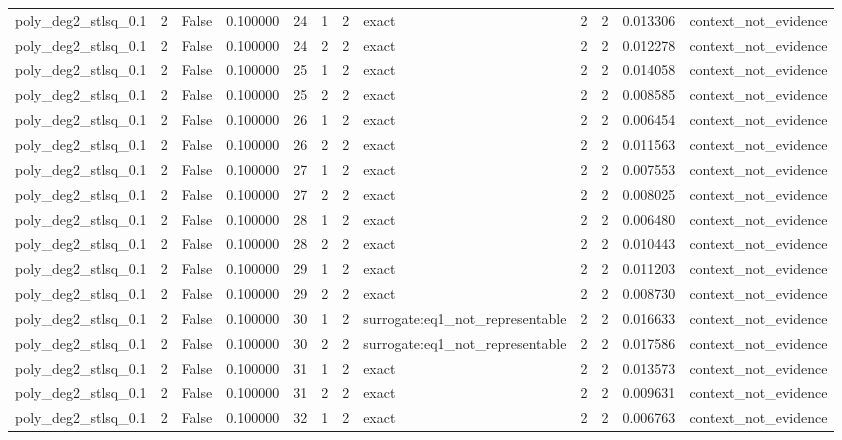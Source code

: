 \begin{tabular}{lrrrrrrlrrrl}
poly\_deg2\_stlsq\_0.1 & 2 & False & 0.100000 & 24 & 1 & 2 & exact & 2 & 2 & 0.013306 & context\_not\_evidence \\
poly\_deg2\_stlsq\_0.1 & 2 & False & 0.100000 & 24 & 2 & 2 & exact & 2 & 2 & 0.012278 & context\_not\_evidence \\
poly\_deg2\_stlsq\_0.1 & 2 & False & 0.100000 & 25 & 1 & 2 & exact & 2 & 2 & 0.014058 & context\_not\_evidence \\
poly\_deg2\_stlsq\_0.1 & 2 & False & 0.100000 & 25 & 2 & 2 & exact & 2 & 2 & 0.008585 & context\_not\_evidence \\
poly\_deg2\_stlsq\_0.1 & 2 & False & 0.100000 & 26 & 1 & 2 & exact & 2 & 2 & 0.006454 & context\_not\_evidence \\
poly\_deg2\_stlsq\_0.1 & 2 & False & 0.100000 & 26 & 2 & 2 & exact & 2 & 2 & 0.011563 & context\_not\_evidence \\
poly\_deg2\_stlsq\_0.1 & 2 & False & 0.100000 & 27 & 1 & 2 & exact & 2 & 2 & 0.007553 & context\_not\_evidence \\
poly\_deg2\_stlsq\_0.1 & 2 & False & 0.100000 & 27 & 2 & 2 & exact & 2 & 2 & 0.008025 & context\_not\_evidence \\
poly\_deg2\_stlsq\_0.1 & 2 & False & 0.100000 & 28 & 1 & 2 & exact & 2 & 2 & 0.006480 & context\_not\_evidence \\
poly\_deg2\_stlsq\_0.1 & 2 & False & 0.100000 & 28 & 2 & 2 & exact & 2 & 2 & 0.010443 & context\_not\_evidence \\
poly\_deg2\_stlsq\_0.1 & 2 & False & 0.100000 & 29 & 1 & 2 & exact & 2 & 2 & 0.011203 & context\_not\_evidence \\
poly\_deg2\_stlsq\_0.1 & 2 & False & 0.100000 & 29 & 2 & 2 & exact & 2 & 2 & 0.008730 & context\_not\_evidence \\
poly\_deg2\_stlsq\_0.1 & 2 & False & 0.100000 & 30 & 1 & 2 & surrogate:eq1\_not\_representable & 2 & 2 & 0.016633 & context\_not\_evidence \\
poly\_deg2\_stlsq\_0.1 & 2 & False & 0.100000 & 30 & 2 & 2 & surrogate:eq1\_not\_representable & 2 & 2 & 0.017586 & context\_not\_evidence \\
poly\_deg2\_stlsq\_0.1 & 2 & False & 0.100000 & 31 & 1 & 2 & exact & 2 & 2 & 0.013573 & context\_not\_evidence \\
poly\_deg2\_stlsq\_0.1 & 2 & False & 0.100000 & 31 & 2 & 2 & exact & 2 & 2 & 0.009631 & context\_not\_evidence \\
poly\_deg2\_stlsq\_0.1 & 2 & False & 0.100000 & 32 & 1 & 2 & exact & 2 & 2 & 0.006763 & context\_not\_evidence \\

\end{tabular}
